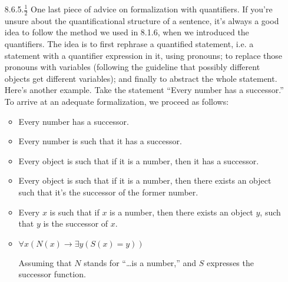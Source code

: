 \begin{enumerate}[\thesection.1]
\begin{longtable}{p{7cm} c l}
		
		\end{longtable}
		
		\item[8.6.5.$\frac{1}{2}$] One last piece of advice on formalization with quantifiers. If you're unsure about the quantificational structure of a sentence, it's always a good idea to follow the method we used in 8.1.6, when we introduced the quantifiers. The idea is to first rephrase a quantified statement, i.e. a statement with a quantifier expression in it, using pronouns;  to replace those pronouns with variables (following the guideline that possibly different objects get different variables); and finally to abstract the whole statement. Here's another example. Take the statement ``Every number has a successor.'' To arrive at an adequate formalization, we proceed as follows:
		\begin{itemize}
		
			\item Every number has a successor.
			
			\item Every number is such that it has a successor.
			
			\item Every object is such that if it is a number, then it has a successor.
			
			\item Every object is such that if it is a number, then there exists an object such that it's the successor of the former number.
			
			\item Every $x$ is such that if $x$ is a number, then there exists an object $y$, such that $y$ is the successor of $x$.
			
			\item $\forall x(N(x)\to \exists y(S(x)=y))$
			
			\item[] Assuming that $N$ stands for ``\dots is a number,'' and $S$ expresses the successor function.
		
		\end{itemize}
		

\end{enumerate}

